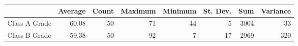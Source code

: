 \begin{tabular}{lrrrrrrr}
\toprule
{} &  Average &  Count &  Maximum &  Minimum &  St. Dev. &   Sum &  Variance \\
\midrule
Class A Grade &    60.08 &     50 &       71 &       44 &         5 &  3004 &        33 \\
Class B Grade &    59.38 &     50 &       92 &        7 &        17 &  2969 &       320 \\
\bottomrule
\end{tabular}

